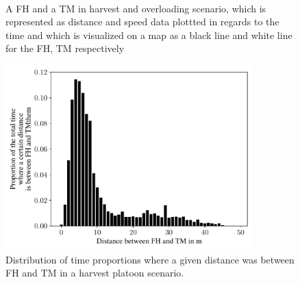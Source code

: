 \begin{figure}%
    \centering
	\\
    \caption{A \ac{FH} and a \ac{TM} in harvest and overloading scenario, which is represented as distance and speed data plottted in regards to the
	time and which is visualized on a map as a black line and white line for the \ac{FH}, \ac{TM} respectively}%
    \label{fig:setups12}%
\end{figure}
\begin{figure}%
	\centering
	\includegraphics[width=0.85\textwidth]{figures/distanceHarvestScenario.pdf}
	\caption{Distribution of time proportions where a given distance was between \acf{FH} and \acf{TM} in a harvest platoon scenario.}%
	\label{fig:distance}%
\end{figure}
